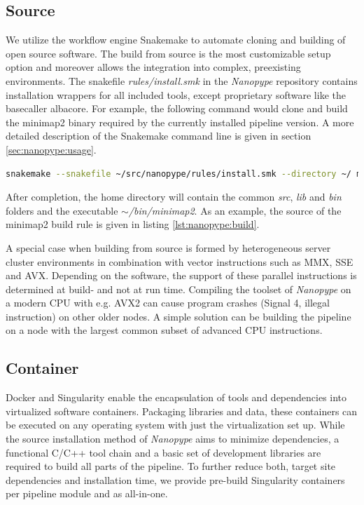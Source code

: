 \subsection{Source}

We utilize the workflow engine Snakemake to automate cloning and building of open source software. The build from source is the most customizable setup option and moreover allows the integration into complex, preexisting environments. The snakefile \textit{rules/install.smk} in the \textit{Nanopype} repository contains installation wrappers for all included tools, except proprietary software like the basecaller albacore. For example, the following command would clone and build the minimap2 binary required by the currently installed pipeline version. A more detailed description of the Snakemake command line is given in section \ref{sec:nanopype:usage}.

\begin{lstlisting}[language=sh, caption=Snakemake tool installation example]
snakemake --snakefile ~/src/nanopype/rules/install.smk --directory ~/ minimap2
\end{lstlisting}

After completion, the home directory will contain the common \textit{src}, \textit{lib} and \textit{bin} folders and the executable $\sim$\textit{/bin/minimap2}. As an example, the source of the minimap2 build rule is given in listing \ref{lst:nanopype:build}.

A special case when building from source is formed by heterogeneous server cluster environments in combination with vector instructions such as MMX, SSE and AVX. Depending on the software, the support of these parallel instructions is determined at build- and not at run time. Compiling the toolset of \textit{Nanopype} on a modern CPU with e.g. AVX2 can cause program crashes (Signal 4, illegal instruction) on other older nodes. A simple solution can be building the pipeline on a node with the largest common subset of advanced CPU instructions.


\subsection{Container}

Docker and Singularity enable the encapsulation of tools and dependencies into virtualized software containers. Packaging libraries and data, these containers can be executed on any operating system with just the virtualization set up. While the source installation method of \textit{Nanopype} aims to minimize dependencies, a functional C/C++ tool chain and a basic set of development libraries are required to build all parts of the pipeline. To further reduce both, target site dependencies and installation time, we provide pre-build Singularity containers per pipeline module and as all-in-one.

